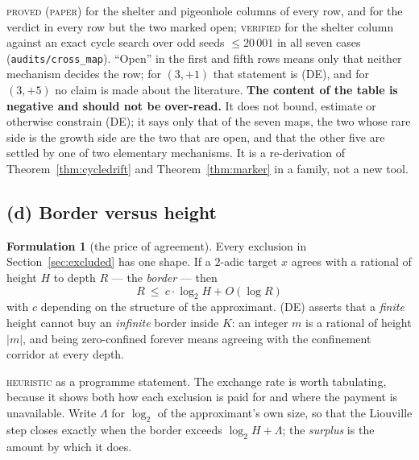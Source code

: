 \documentclass[11pt,reqno]{amsart}
\theoremstyle{plain}
\theoremstyle{definition}
\newtheorem{formulation}[theorem]{Formulation}
\newcommand{\lab}[1]{\textnormal{\textsc{\small #1}}}
\begin{document}
\lab{proved (paper)} for the shelter and pigeonhole columns of every row, and for the
verdict in every row but the two marked open; \lab{verified} for the shelter column
against an exact cycle search over odd seeds $\le20\,001$ in all seven cases
(\texttt{audits/cross\_map}). ``Open'' in the first and fifth rows means only that
neither mechanism decides the row; for $(3,+1)$ that statement is \textup{(DE)}, and
for $(3,+5)$ no claim is made about the literature.
\textbf{The content of the table is negative and should not be over-read.} It does not bound, estimate or otherwise constrain (DE); it says
only that of the seven maps, the two whose rare side is the growth side are the two
that are open, and that the other five are settled by one of two elementary
mechanisms. It is a re-derivation of Theorem~\ref{thm:cycledrift} and
Theorem~\ref{thm:marker} in a family, not a new tool.

\subsection*{(d) Border versus height}

\begin{formulation}[the price of agreement]\label{form:border}
Every exclusion in Section~\ref{sec:excluded} has one shape. If a $2$-adic target
$x$ agrees with a rational of height $H$ to depth $R$ --- the \emph{border} --- then
\[
R\ \le\ c\cdot\log_2 H+O(\log R)
\]
with $c$ depending on the structure of the approximant. \textup{(DE)} asserts that
a \emph{finite} height cannot buy an \emph{infinite} border inside $K$: an integer
$m$ is a rational of height $|m|$, and being zero-confined forever means agreeing
with the confinement corridor at every depth.
\end{formulation}
\lab{heuristic} as a programme statement. The exchange rate is worth tabulating,
because it shows both how each exclusion is paid for and where the payment is
unavailable. Write $\Lambda$ for $\log_2$ of the approximant's own size, so that
the Liouville step closes exactly when the border exceeds $\log_2 H+\Lambda$; the
\emph{surplus} is the amount by which it does.
\end{document}
